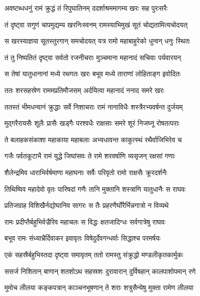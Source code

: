 
\twolineshloka
{अवष्टब्धधनुं रामं क्रुद्धं तं रिपुघातिनम्}
{ददर्शाश्रममागम्य खरः सह पुरःसरैः} %

\twolineshloka
{तं दृष्ट्वा सगुणं चापमुद्यम्य खरनिःस्वनम्}
{रामस्याभिमुखं सूतं चोद्यतामित्यचोदयत्} %

\twolineshloka
{स खरस्याज्ञया सूतस्तुरगान् समचोदयत्}
{यत्र रामो महाबाहुरेको धुन्वन् धनुः स्थितः} %

\twolineshloka
{तं तु निष्पतितं दृष्ट्वा सर्वतो रजनीचराः}
{मुञ्चमाना महानादं सचिवाः पर्यवारयन्} %

\twolineshloka
{स तेषां यातुधानानां मध्ये रथगतः खरः}
{बभूव मध्ये ताराणां लोहिताङ्ग इवोदितः} %

\twolineshloka
{ततः शरसहस्रेण राममप्रतिमौजसम्}
{अर्दयित्वा महानादं ननाद समरे खरः} %

\twolineshloka
{ततस्तं भीमधन्वानं क्रुद्धाः सर्वे निशाचराः}
{रामं नानाविधैः शस्त्रैरभ्यवर्षन्त दुर्जयम्} %

\twolineshloka
{मुद्गरैरायसैः शूलैः प्रासैः खड्गैः परश्वधैः}
{राक्षसाः समरे शूरं निजघ्नू रोषतत्पराः} %

\twolineshloka
{ते बलाहकसंकाशा महाकाया महाबलाः}
{अभ्यधावन्त काकुत्स्थं रथैर्वाजिभिरेव च} %

\twolineshloka
{गजैः पर्वतकूटाभै रामं युद्धे जिघांसवः}
{ते रामे शरवर्षाणि व्यसृजन् रक्षसां गणाः} %

\twolineshloka
{शैलेन्द्रमिव धाराभिर्वर्षमाणा महाघनाः}
{सर्वैः परिवृतो रामो राक्षसैः क्रूरदर्शनैः} %

\twolineshloka
{तिथिष्विव महादेवो वृतः पारिषदां गणैः}
{तानि मुक्तानि शस्त्राणि यातुधानैः स राघवः} %

\twolineshloka
{प्रतिजग्राह विशिखैर्नद्योघानिव सागरः}
{स तैः प्रहरणैर्घोरैर्भिन्नगात्रो न विव्यथे} %

\twolineshloka
{रामः प्रदीप्तैर्बहुभिर्वज्रैरिव महाचलः}
{स विद्धः क्षतजादिग्धः सर्वगात्रेषु राघवः} %

\twolineshloka
{बभूव रामः संध्याभ्रैर्दिवाकर इवावृतः}
{विषेदुर्देवगन्धर्वाः सिद्धाश्च परमर्षयः} %

\twolineshloka
{एकं सहस्रैर्बहुभिस्तदा दृष्ट्वा समावृतम्}
{ततो रामस्तु संक्रुद्धो मण्डलीकृतकार्मुकः} %

\twolineshloka
{ससर्ज निशितान् बाणान् शतशोऽथ सहस्रशः}
{दुरावारान् दुर्विषहान् कालपाशोपमान् रणे} %

\twolineshloka
{मुमोच लीलया कङ्कपत्रान् काञ्चनभूषणान्}
{ते शराः शत्रुसैन्येषु मुक्ता रामेण लीलया} %

